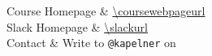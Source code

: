 Course Homepage 							& \url{\coursewebpageurl} \\
Slack	 Homepage 							& \url{\slackurl} \\
Contact 										& Write to \texttt{@kapelner} on \slacklink  \\
